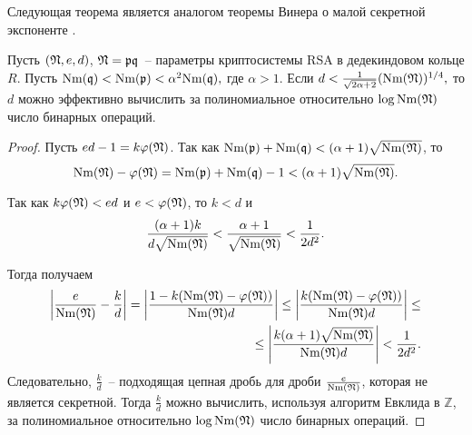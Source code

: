 \documentclass[_00_dissertation.tex]{subfiles}
\begin{document}
Следующая теорема является аналогом теоремы Винера о малой секретной экспоненте \cite{source:Wiener}.

\begin{theorem}\label{theorem:Wiener}
    Пусть $(\mathfrak{N},e,d)$, $\mathfrak{N}=\mathfrak{p} \mathfrak{q}$~-- параметры криптосистемы RSA в дедекиндовом кольце $R$.
    Пусть $\textrm{Nm}(\mathfrak{q}) < \textrm{Nm}(\mathfrak{p}) < \alpha^2 \textrm{Nm}(\mathfrak{q}),$ где $\alpha > 1.$
    Если $d<\frac{1}{\sqrt{2\alpha+2}}(\textrm{Nm}(\mathfrak{N}))^{1/4},$ то $d$ можно эффективно вычислить за полиномиальное относительно $\log \textrm{Nm}(\mathfrak{N})$ число бинарных операций.
\end{theorem}
\begin{proof}
    Пусть $ed - 1 = k \varphi(\mathfrak{N})$.
    Так как $\textrm{Nm}(\mathfrak{p}) + \textrm{Nm}(\mathfrak{q}) < (\alpha + 1)\sqrt{\textrm{Nm}(\mathfrak{N})}$, то
    \begin{equation*}
        \textrm{Nm}(\mathfrak{N}) - \varphi(\mathfrak{N}) = \textrm{Nm}(\mathfrak{p}) + \textrm{Nm}(\mathfrak{q}) - 1 < (\alpha + 1)\sqrt{\textrm{Nm}(\mathfrak{N})}.
    \end{equation*}
    
    Так как $k \varphi(\mathfrak{N}) < ed$ и $e < \varphi(\mathfrak{N})$, то $k < d$ и
    \begin{equation*}
        \frac{(\alpha + 1)k}{d\sqrt{\textrm{Nm}(\mathfrak{N})}} < \frac{\alpha + 1}{\sqrt{\textrm{Nm}(\mathfrak{N})}} < \frac{1}{2 d^2}.
    \end{equation*}
    
    Тогда получаем
    \begin{equation*}
        \begin{split}
            \left|
                \frac{e}{\textrm{Nm}(\mathfrak{N})} - \frac{k}{d}
            \right| = \left|
                \frac{1 - k(\textrm{Nm}(\mathfrak{N}) - \varphi(\mathfrak{N}))}{\textrm{Nm}(\mathfrak{N})d}
            \right| \le \left|
                \frac{k(\textrm{Nm}(\mathfrak{N}) - \varphi(\mathfrak{N}))}{\textrm{Nm}(\mathfrak{N})d}
            \right| \le \\
            \le \left|
                \frac{k(\alpha + 1)\sqrt{\textrm{Nm}(\mathfrak{N})}}{\textrm{Nm}(\mathfrak{N})d}
            \right| < \frac{1}{2 d^2}.
        \end{split}
    \end{equation*}
    Следовательно, $\frac{k}{d}$~-- подходящая цепная дробь для дроби $\frac{e}{\textrm{Nm}(\mathfrak{N})}$, которая не является секретной.
    Тогда $\frac{k}{d}$ можно вычислить, используя алгоритм Евклида в $\mathbb{Z}$, за полиномиальное относительно $\log \textrm{Nm}(\mathfrak{N})$ число бинарных операций.
\end{proof}
\end{document}
